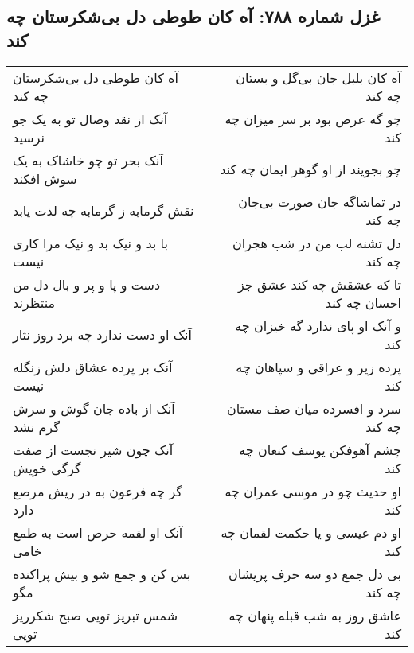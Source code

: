 \begin{center}
\section*{غزل شماره ۷۸۸: آه کان طوطی دل بی‌شکرستان چه کند}
\label{sec:0788}
\begin{longtable}{l p{0.5cm} r}
آه کان طوطی دل بی‌شکرستان چه کند
&&
آه کان بلبل جان بی‌گل و بستان چه کند
\\
آنک از نقد وصال تو به یک جو نرسید
&&
چو گه عرض بود بر سر میزان چه کند
\\
آنک بحر تو چو خاشاک به یک سوش افکند
&&
چو بجویند از او گوهر ایمان چه کند
\\
نقش گرمابه ز گرمابه چه لذت یابد
&&
در تماشاگه جان صورت بی‌جان چه کند
\\
با بد و نیک بد و نیک مرا کاری نیست
&&
دل تشنه لب من در شب هجران چه کند
\\
دست و پا و پر و بال دل من منتظرند
&&
تا که عشقش چه کند عشق جز احسان چه کند
\\
آنک او دست ندارد چه برد روز نثار
&&
و آنک او پای ندارد گه خیزان چه کند
\\
آنک بر پرده عشاق دلش زنگله نیست
&&
پرده زیر و عراقی و سپاهان چه کند
\\
آنک از باده جان گوش و سرش گرم نشد
&&
سرد و افسرده میان صف مستان چه کند
\\
آنک چون شیر نجست از صفت گرگی خویش
&&
چشم آهوفکن یوسف کنعان چه کند
\\
گر چه فرعون به در ریش مرصع دارد
&&
او حدیث چو در موسی عمران چه کند
\\
آنک او لقمه حرص است به طمع خامی
&&
او دم عیسی و یا حکمت لقمان چه کند
\\
بس کن و جمع شو و بیش پراکنده مگو
&&
بی دل جمع دو سه حرف پریشان چه کند
\\
شمس تبریز تویی صبح شکرریز تویی
&&
عاشق روز به شب قبله پنهان چه کند
\\
\end{longtable}
\end{center}
